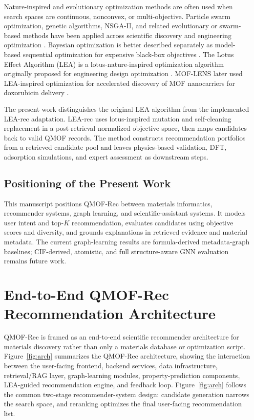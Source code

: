 \documentclass[12pt,a4paper]{article}
\begin{document}
Nature-inspired and evolutionary optimization methods are often used when search spaces are continuous, nonconvex, or multi-objective. Particle swarm optimization, genetic algorithms, NSGA-II, and related evolutionary or swarm-based methods have been applied across scientific discovery and engineering optimization \cite{deb2002}. Bayesian optimization is better described separately as model-based sequential optimization for expensive black-box objectives \cite{shahriari2016}. The Lotus Effect Algorithm (LEA) is a lotus-nature-inspired optimization algorithm originally proposed for engineering design optimization \cite{dalirinia2024}. MOF-LENS later used LEA-inspired optimization for accelerated discovery of MOF nanocarriers for doxorubicin delivery \cite{jalali2025lens}.

The present work distinguishes the original LEA algorithm from the implemented LEA-rec adaptation. LEA-rec uses lotus-inspired mutation and self-cleaning replacement in a post-retrieval normalized objective space, then maps candidates back to valid QMOF records. The method constructs recommendation portfolios from a retrieved candidate pool and leaves physics-based validation, DFT, adsorption simulations, and expert assessment as downstream steps.

\subsection{Positioning of the Present Work}

This manuscript positions QMOF-Rec between materials informatics, recommender systems, graph learning, and scientific-assistant systems. It models user intent and top-$K$ recommendation, evaluates candidates using objective scores and diversity, and grounds explanations in retrieved evidence and material metadata. The current graph-learning results are formula-derived metadata-graph baselines; CIF-derived, atomistic, and full structure-aware GNN evaluation remains future work.

\section{End-to-End QMOF-Rec Recommendation Architecture}
\label{sec:arch}

QMOF-Rec is framed as an end-to-end scientific recommender architecture for materials discovery rather than only a materials database or optimization script. Figure~\ref{fig:arch} summarizes the QMOF-Rec architecture, showing the interaction between the user-facing frontend, backend services, data infrastructure, retrieval/RAG layer, graph-learning modules, property-prediction components, LEA-guided recommendation engine, and feedback loop. Figure~\ref{fig:arch} follows the common two-stage recommender-system design: candidate generation narrows the search space, and reranking optimizes the final user-facing recommendation list.
\end{document}
